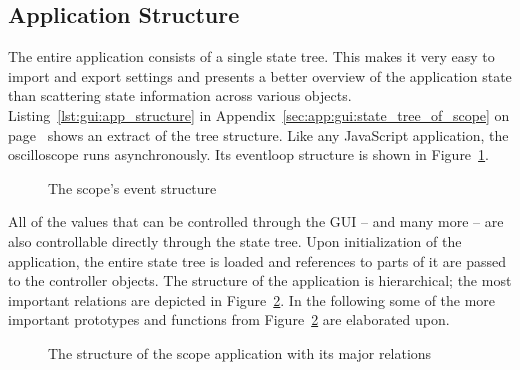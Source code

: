 %
%

\subsection{Application Structure} %
\label{subsec:gui:application_structure}


The  entire   application  consists  of   a  single  state   tree. This  makes
it   very   easy   to   import    and   export   settings   and   presents   a
better   overview   of   the   application   state   than   scattering   state
information   across  various   objects.   Listing~\ref{lst:gui:app_structure}
in              Appendix~\ref{sec:app:gui:state_tree_of_scope}              on
page~\pageref{sec:app:gui:state_tree_of_scope}   shows  an   extract  of   the
tree   structure. Like   any    JavaScript   application,   the   oscilloscope
runs     asynchronously. Its    eventloop     structure     is    shown     in
Figure~\ref{fig:gui:eventstructure}.

\begin{figure}
    \centering
    
    \caption[Scope Event Structure]{%
        The scope's event structure
    }
    \label{fig:gui:eventstructure}
\end{figure}

All of the values  that can be controlled through the GUI --  and many more --
are  also controllable  directly through  the state  tree. Upon initialization
of  the  application, the  entire  state  tree  is  loaded and  references  to
parts  of it  are passed  to  the controller  objects.  The  structure of  the
application  is hierarchical;  the most  important relations  are depicted  in
Figure~\ref{fig:gui:structure}.  In  the following some of  the more important
prototypes  and functions  from Figure~\ref{fig:gui:structure}  are elaborated
upon.

\begin{figure}
    \centering
    
    \caption[The scope structure]{%
        The structure of the scope application with its major relations%
    }
    \label{fig:gui:structure}
\end{figure}

